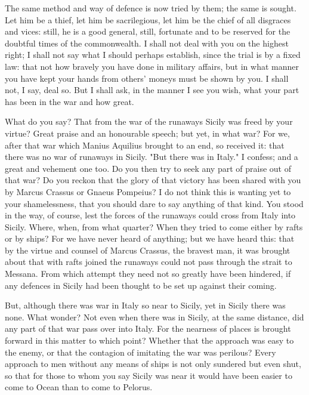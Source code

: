  The same method and way of defence is now tried by them; the same is sought. Let him be a thief, let him be sacrilegious, let him be the chief of all disgraces and vices: still, he is a good general, still, fortunate and to be reserved for the doubtful times of the commonwealth. I shall not deal with you on the highest right; I shall not say what I should perhaps establish, since the trial is by a fixed law: that not how bravely you have done in military affairs, but in what manner you have kept your hands from others' moneys must be shown by you. I shall not, I say, deal so. But I shall ask, in the manner I see you wish, what your part has been in the war and how great.

 What do you say? That from the war of the runaways Sicily was freed by your virtue? Great praise and an honourable speech; but yet, in what war? For we, after that war which Manius Aquilius brought to an end, so received it: that there was no war of runaways in Sicily. "But there was in Italy." I confess; and a great and vehement one too. Do you then try to seek any part of praise out of that war? Do you reckon that the glory of that victory has been shared with you by Marcus Crassus or Gnaeus Pompeius? I do not think this is wanting yet to your shamelessness, that you should dare to say anything of that kind. You stood in the way, of course, lest the forces of the runaways could cross from Italy into Sicily. Where, when, from what quarter? When they tried to come either by rafts or by ships? For we have never heard of anything; but we have heard this: that by the virtue and counsel of Marcus Crassus, the bravest man, it was brought about that with rafts joined the runaways could not pass through the strait to Messana. From which attempt they need not so greatly have been hindered, if any defences in Sicily had been thought to be set up against their coming.

 But, although there was war in Italy so near to Sicily, yet in Sicily there was none. What wonder? Not even when there was in Sicily, at the same distance, did any part of that war pass over into Italy. For the nearness of places is brought forward in this matter to which point? Whether that the approach was easy to the enemy, or that the contagion of imitating the war was perilous? Every approach to men without any means of ships is not only sundered but even shut, so that for those to whom you say Sicily was near it would have been easier to come to Ocean than to come to Pelorus.

